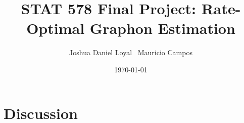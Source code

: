 \documentclass[11pt]{article}
\begin{document}
\title{  {\LARGE STAT 578 Final Project: Rate-Optimal Graphon Estimation} }

\author{
Joshua Daniel Loyal \,
Mauricio Campos
}

\date{\today}
\maketitle











%

\section{Discussion}\label{sec:disc}



\end{document}
